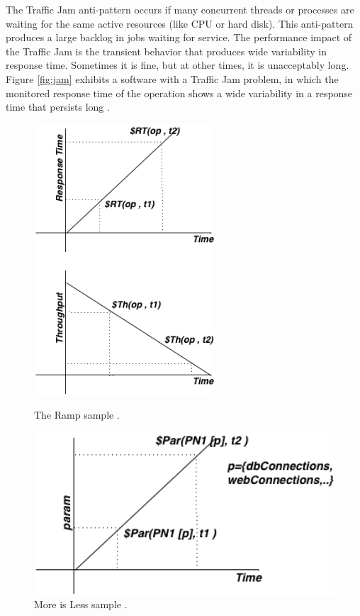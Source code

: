 \documentclass[espaco=umemeio,chapter=TITLE,twoside,openright]{abnt}
\begin{document}
The Traffic Jam anti-pattern occurs if many concurrent threads or processes are waiting for the same  active resources (like CPU or hard disk). This anti-pattern produces a large backlog in jobs waiting for service. The performance impact of the Traffic Jam is the transient behavior that produces wide variability in response time. Sometimes it is fine, but at other times, it is unacceptably long. Figure \ref{fig:jam} exhibits a software with a Traffic Jam problem, in which the monitored response time of the operation shows a wide variability in a response time that persists long \cite{Vetoio2011}.


\begin{figure}[!h]
\begin{minipage}{.5\textwidth}
\centering
\includegraphics[width=0.6\textwidth]{./images/ramp.png}
\caption{The Ramp sample \cite{Vetoio2011}.}
\label{fig:ramp}
\end{minipage}
\begin{minipage}{.5\textwidth}
\centering
\includegraphics[width=1\textwidth]{./images/moreisless.png}
\caption{More is Less sample \cite{Vetoio2011}.}
\label{fig:moreisless}
\end{minipage}
\end{figure}
\end{document}
